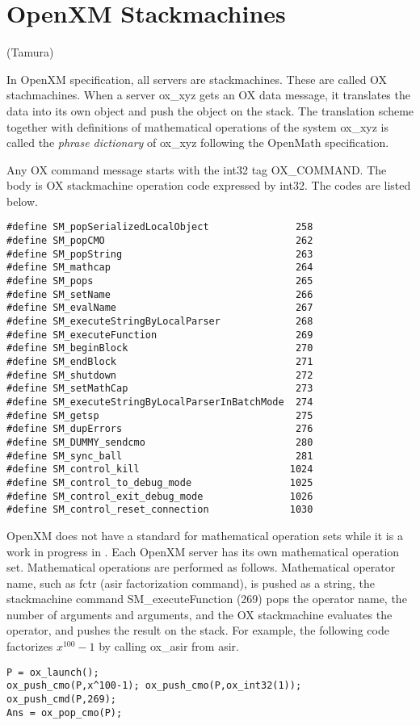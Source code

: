 
\section{OpenXM Stackmachines}   (Tamura)

In OpenXM specification, all servers are stackmachines.
These are called OX stachmachines.
When a server ox\_xyz gets an OX data message,
it translates the data into its own object and push the object
on the stack.
The translation scheme together with definitions of 
mathematical operations
of the system ox\_xyz is called the {\it phrase dictionary} of
ox\_xyz following the OpenMath specification.

Any OX command message starts with the int32 tag OX\_COMMAND.
The body is OX stackmachine operation code expressed by int32.
The codes are listed below.
\begin{verbatim}
#define SM_popSerializedLocalObject               258
#define SM_popCMO                                 262
#define SM_popString                              263
#define SM_mathcap                                264
#define SM_pops                                   265
#define SM_setName                                266
#define SM_evalName                               267
#define SM_executeStringByLocalParser             268
#define SM_executeFunction                        269
#define SM_beginBlock                             270
#define SM_endBlock                               271
#define SM_shutdown                               272
#define SM_setMathCap                             273
#define SM_executeStringByLocalParserInBatchMode  274
#define SM_getsp                                  275
#define SM_dupErrors                              276
#define SM_DUMMY_sendcmo                          280
#define SM_sync_ball                              281
#define SM_control_kill                          1024
#define SM_control_to_debug_mode                 1025
#define SM_control_exit_debug_mode               1026
#define SM_control_reset_connection              1030
\end{verbatim}

OpenXM does not have a standard for mathematical operation sets
while it is a work in progress in \cite{gap}.
Each OpenXM server has its own mathematical operation set.
Mathematical operations are performed as follows.
Mathematical operator name, such as fctr (asir factorization command),
is pushed as a string,
the stackmachine command
SM\_executeFunction (269) pops the operator name, the number of arguments
and arguments, and
the OX stackmachine evaluates the operator, and pushes the result on the stack.
For example, the following code factorizes $x^{100}-1$ by calling
ox\_asir from asir.
\begin{verbatim}
P = ox_launch(); 
ox_push_cmo(P,x^100-1); ox_push_cmo(P,ox_int32(1));
ox_push_cmd(P,269); 
Ans = ox_pop_cmo(P);
\end{verbatim}

